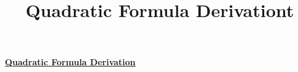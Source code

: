 \documentclass[10pt]{article}
\title{Quadratic Formula Derivationt}
\begin{document}
\textbf{\underline{Quadratic Formula Derivation}}\\
\\

\largeskip
\end{document}

